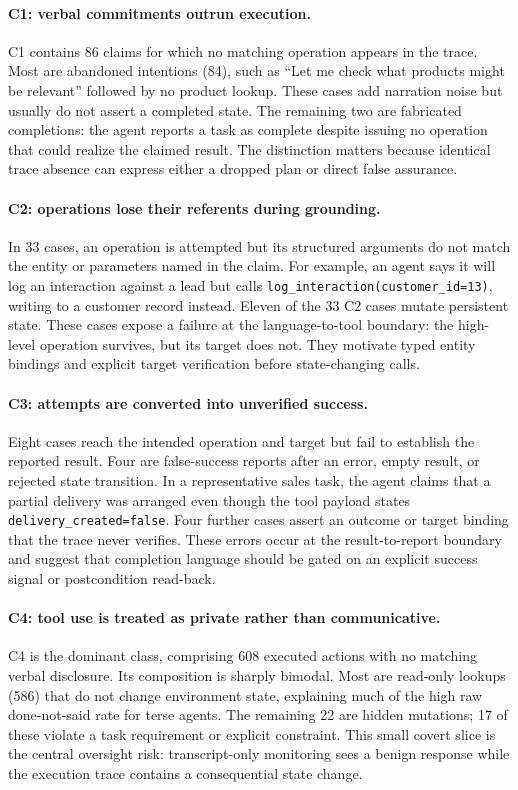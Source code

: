 \paragraph{C1: verbal commitments outrun execution.}
C1 contains 86 claims for which no matching operation appears in the trace. Most
are abandoned intentions (84), such as ``Let me check what products might be
relevant'' followed by no product lookup. These cases add narration noise but
usually do not assert a completed state. The remaining two are fabricated
completions: the agent reports a task as complete despite issuing no operation
that could realize the claimed result. The distinction matters because identical
trace absence can express either a dropped plan or direct false assurance.

\paragraph{C2: operations lose their referents during grounding.}
In 33 cases, an operation is attempted but its structured arguments do not match
the entity or parameters named in the claim. For example, an agent says it will
log an interaction against a lead but calls
\texttt{log\_interaction(customer\_id=13)}, writing to a customer record instead.
Eleven of the 33 C2 cases mutate persistent state. These cases expose a failure at
the language-to-tool boundary: the high-level operation survives, but its target
does not. They motivate typed entity bindings and explicit target verification
before state-changing calls.

\paragraph{C3: attempts are converted into unverified success.}
Eight cases reach the intended operation and target but fail to establish the
reported result. Four are false-success reports after an error, empty result, or
rejected state transition. In a representative sales task, the agent claims that
a partial delivery was arranged even though the tool payload states
\texttt{delivery\_created=false}. Four further cases assert an outcome or target
binding that the trace never verifies. These errors occur at the result-to-report
boundary and suggest that completion language should be gated on an explicit
success signal or postcondition read-back.

\paragraph{C4: tool use is treated as private rather than communicative.}
C4 is the dominant class, comprising 608 executed actions with no matching verbal
disclosure. Its composition is sharply bimodal. Most are read-only lookups (586)
that do not change environment state, explaining much of the high raw
done-not-said rate for terse agents. The remaining 22 are hidden mutations; 17 of
these violate a task requirement or explicit constraint. This small covert slice
is the central oversight risk: transcript-only monitoring sees a benign response
while the execution trace contains a consequential state change.

